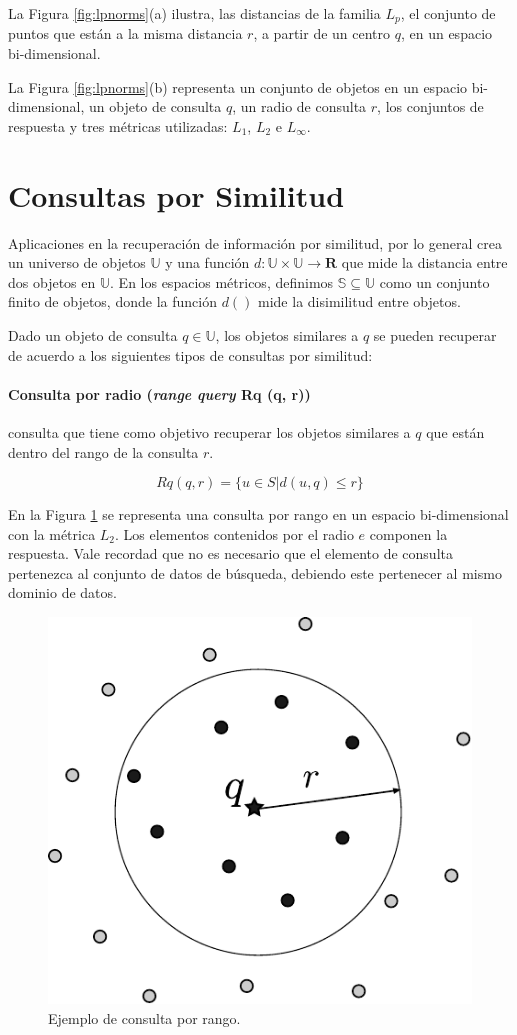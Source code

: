 La Figura \ref{fig:lpnorms}(a)  ilustra,  las distancias de la familia  $L_p$, el conjunto de puntos que están a la misma distancia $r$, a partir de un centro $q$, en un  espacio bi-dimensional.

La Figura \ref{fig:lpnorms}(b) representa un conjunto de objetos en un  espacio bi-dimensional, un objeto de consulta $q$, un radio de consulta $r$, los conjuntos de respuesta y tres métricas utilizadas: $L_1$, $L_2$ e $L_{\infty}$.

\section{Consultas por Similitud}\label{sec:consultas-similaridade}

Aplicaciones en la recuperación de información por similitud, por lo general crea un universo de objetos $\mathbb{U}$  y una función $d: \mathbb{U} \times \mathbb{U} \rightarrow \mathbf{R} $ que mide la distancia entre dos objetos en $\mathbb{U} $. En los espacios métricos, definimos $\mathbb{S} \subseteq \mathbb{U} $ como un conjunto finito de objetos, donde la función $d()$ mide la disimilitud entre objetos.

Dado un objeto de consulta $q \in \mathbb{U} $,  los objetos similares a $q$  se pueden recuperar de acuerdo a los siguientes tipos de consultas por similitud:

\paragraph{Consulta por radio (\textit{range query} Rq (q, r))} consulta que tiene como objetivo recuperar los objetos similares a $q$ que están dentro del rango de la consulta $r$.

\begin{equation}
    Rq(q, r) = \{ u \in S | d(u, q) \leq r \}
\end{equation}

En la Figura \ref{fig:rangeQuery} se representa una consulta por rango en un espacio bi-dimensional con la métrica $L_2$. Los elementos contenidos por el radio $e$ componen la respuesta. Vale recordad que no es necesario que el elemento de consulta pertenezca al conjunto de datos de búsqueda, debiendo este pertenecer al mismo dominio de datos.

\begin{figure}[htp]
\centering
\includegraphics[width=0.3\columnwidth]{images/range_query.pdf}
\caption{Ejemplo de consulta por rango.}
\label{fig:rangeQuery}
\end{figure}


